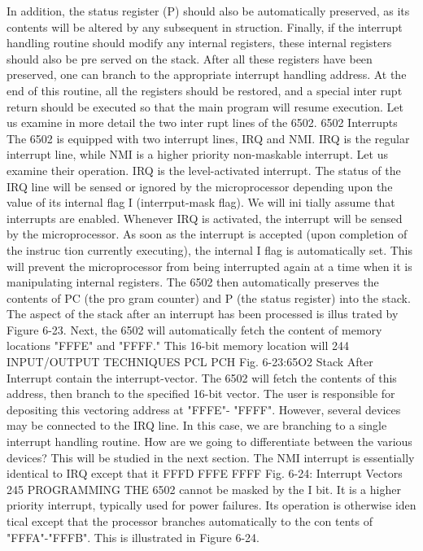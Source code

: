 In addition, the status register (P) should also be automatically
preserved, as its contents will be altered by any subsequent in
struction. Finally, if the interrupt handling routine should modify
any internal registers, these internal registers should also be pre
served on the stack.
After all these registers have been preserved, one can branch to
the appropriate interrupt handling address. At the end of this
routine, all the registers should be restored, and a special inter
rupt return should be executed so that the main program will
resume execution. Let us examine in more detail the two inter
rupt lines of the 6502.
6502 Interrupts
The 6502 is equipped with two interrupt lines, IRQ and NMI.
IRQ is the regular interrupt line, while NMI is a higher priority
non-maskable interrupt. Let us examine their operation.
IRQ is the level-activated interrupt. The status of the IRQ line
will be sensed or ignored by the microprocessor depending upon
the value of its internal flag I (interrput-mask flag). We will ini
tially assume that interrupts are enabled. Whenever IRQ is
activated, the interrupt will be sensed by the microprocessor. As
soon as the interrupt is accepted (upon completion of the instruc
tion currently executing), the internal I flag is automatically set.
This will prevent the microprocessor from being interrupted
again at a time when it is manipulating internal registers. The
6502 then automatically preserves the contents of PC (the pro
gram counter) and P (the status register) into the stack. The
aspect of the stack after an interrupt has been processed is illus
trated by Figure 6-23.
Next, the 6502 will automatically fetch the content of memory
locations "FFFE" and "FFFF." This 16-bit memory location will
244
INPUT/OUTPUT TECHNIQUES
PCL
PCH
Fig. 6-23:65O2 Stack After Interrupt
contain the interrupt-vector. The 6502 will fetch the contents of
this address, then branch to the specified 16-bit vector. The user is
responsible for depositing this vectoring address at "FFFE"-
"FFFF". However, several devices may be connected to the IRQ
line. In this case, we are branching to a single interrupt handling
routine. How are we going to differentiate between the various
devices? This will be studied in the next section.
The NMI interrupt is essentially identical to IRQ except that it
FFFD
FFFE
FFFF
Fig. 6-24: Interrupt Vectors
245
PROGRAMMING THE 6502
cannot be masked by the I bit. It is a higher priority interrupt,
typically used for power failures. Its operation is otherwise iden
tical except that the processor branches automatically to the con
tents of "FFFA"-"FFFB". This is illustrated in Figure 6-24.
